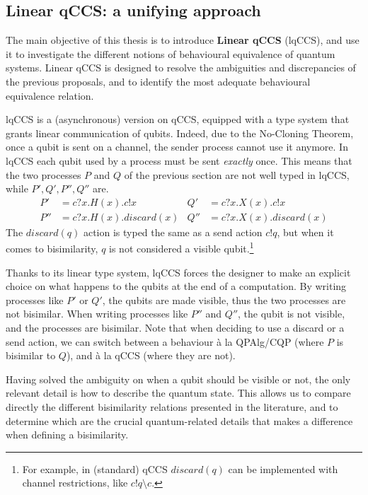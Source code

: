 \subsection*{Linear qCCS: a unifying approach}
The main objective of this thesis is to introduce \textbf{Linear qCCS} (lqCCS), and use it to investigate the different notions of behavioural equivalence of quantum systems. Linear qCCS is designed to resolve the ambiguities and discrepancies of the previous proposals, and to identify the most adequate behavioural equivalence relation.

lqCCS is a (asynchronous) version on qCCS, equipped with a type system that grants linear communication of qubits. Indeed, due to the No-Cloning Theorem, once a qubit is sent on a channel, the sender process cannot use it anymore. In lqCCS each qubit used by a process must be sent \textit{exactly} once. This means that the two processes $P$ and $Q$ of the previous section are not well typed in lqCCS, while $P', Q', P'', Q''$ are.
\begin{align*}
P' &= c?x.H(x).c!x &  Q' &= c?x.X(x).c!x \\
P'' &= c?x.H(x).discard(x) &  Q'' &= c?x.X(x).discard(x)
\end{align*}
The $discard(q)$ action is typed the same as a send action $c!q$, but when it comes to bisimilarity, $q$ is not considered a visible qubit.\footnote{For example, in (standard) qCCS $discard(q)$ can be implemented with channel restrictions, like $c!q\setminus c$.}

Thanks to its linear type system, lqCCS forces the designer to make an explicit choice on what happens to the qubits at the end of a computation. By writing processes like $P'$ or $Q'$, the qubits are made visible, thus the two processes are not bisimilar. When writing processes like $P''$ and $Q''$, the qubit is not visible, and the processes are bisimilar. Note that when deciding to use a discard or a send action, we can switch between a behaviour à la QPAlg/CQP (where $P$ is bisimilar to $Q$), and à la qCCS (where they are not).

Having solved the ambiguity on when a qubit should be visible or not, the only relevant detail is how to describe the quantum state. This allows us to compare directly the different bisimilarity relations presented in the literature, and to determine which are the crucial  quantum-related details that makes a difference when defining a bisimilarity.  

